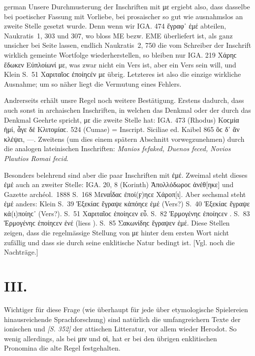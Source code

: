 \begin{otherlanguage*}{german}
Unsere Durchmusterung der Inschriften mit με ergiebt also, dass dasselbe bei poetischer Fassung mit Vorliebe, bei prosaischer so gut wie ausnahmslos an zweite Stelle gesetzt wurde. Denn wenn wir IGA. 474 ἔγραφ᾽ ἐμέ abteilen, Naukratis~1, 303 und 307, wo bloss ΜΕ bezw. ΕΜΕ überliefert ist, als ganz unsicher bei Seite lassen, endlich Naukratis~2, 750 die vom Schreiber der Inschrift wirklich gemeinte Wortfolge wiederherstellen, so bleiben nur IGA. 219 Χάρηϲ ἔδωκεν Εὐπλοίωνί με, was zwar nicht ein Vers ist, aber ein Vers sein will, und Klein S.~51 Χαριταῖοϲ ἐποίηϲέν με übrig. Letzteres ist also die einzige wirkliche Ausnahme; um so näher liegt die Vermutung eines Fehlers.

Andrerseits erhält unsre Regel noch weitere Bestätigung. Erstens dadurch, dass auch sonst in archaischen Inschriften, in welchen das Denkmal oder der durch das Denkmal Geehrte spricht, με die zweite Stelle hat: IGA. 473 (Rhodus) Κοϲμία ἠμί, ἆγε δέ  Κλιτομίαϲ. 524 (Cumae) = Inscript. Siciliae ed. Kaibel 865 ὃϲ δ᾽ ἄν  κλέψει, —. Zweitens (um dies einem spätern Abschnitt vorwegzunehmen) durch die analogen lateinischen Inschriften: \emph{Manios  fefaked, Duenos  feced, Novios Plautios  Romai fecid}.

Besonders belehrend sind aber die paar Inschriften mit ἐμέ. Zweimal steht dieses ἐμέ auch an zweiter Stelle: IGA. 20, 8 (Korinth) Ἀπολλόδωροϲ  ἀνέθ[ηκε] und Gazette archéol.~1888 S.~168 Μεναΐδαϲ  ἐποί(ϝ)ηϲε Χάροπ[ι]. Aber sechsmal steht ἐμέ anders: Klein S.~39 Ἐξε\-κίαϲ ἔγραψε κἀπόηϲε ἐμέ (Vers?) S.~40 Ἐξε\-κίαϲ ἔγραψε κἀ(ι)ποίηϲ᾽  (Vers?). S.~51 Χαριταῖοϲ ἐποίηϲεν  εὖ. S.~82 Ἑρ\-μο\-γέ\-νηϲ ἐποίηϲεν . S.~83 Ἑρμογένηϲ ἐποίηϲεν ἐνέ (liess ). S.~85 Σακω\-νίδηϲ ἔγραψεν ἐμέ. Diese Stellen zeigen, dass die regelmässige Stellung von με hinter dem ersten Wort nicht zufällig und dass sie durch seine enklitische Natur bedingt ist. [Vgl. noch die Nachträge.]

\section*{III.}

Wichtiger für diese Frage (wie überhaupt für jede über etymologische Spielereien hinausreichende Sprachforschung) sind natürlich die umfangreichern Texte der ionischen und \hypertarget{p352}{\emph{[S. 352]}}\label{p352} der attischen Litteratur, vor allem wieder Herodot. So wenig allerdings, als bei μιν und οἱ, hat er bei den übrigen enklitischen Pronomina die alte Regel festgehalten.


\end{otherlanguage*}
